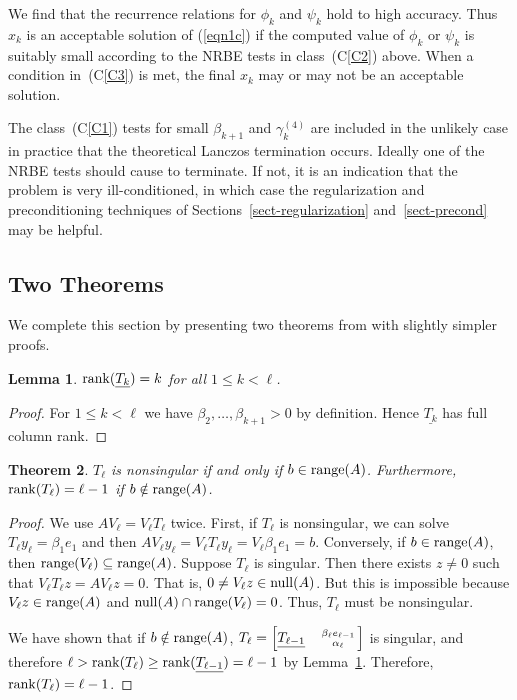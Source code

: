 \documentclass{doc_acmtrans2m}
\newtheorem{theorem}{Theorem}[section]
\newtheorem{lemma}[theorem]{Lemma}
\begin{document}
We find that the recurrence relations for $\phi_k$ and $\psi_k$ hold
to high accuracy. Thus $x_k$ is an acceptable solution of
(\ref{eqn1c}) if the computed value of $\phi_k $ or $\psi_k $ is
suitably small according to the NRBE tests in class~(C\ref{C2})
above. When a condition in~(C\ref{C3}) is met, the final $x_k$ may or
may not be an acceptable solution.

The class~(C\ref{C1}) tests for small $\beta_{k+1}$ and
$\gamma_k^{(4)}$ are included in the unlikely case in practice that
the theoretical Lanczos termination occurs.  Ideally one of the NRBE
tests should cause \MINRESQLP to terminate.  If not, it is an
indication that the problem is very ill-conditioned, in which case the
regularization and preconditioning techniques of
Sections~\ref{sect-regularization} and~\ref{sect-precond} may be
helpful.


\subsection{Two Theorems}

We complete this section by presenting two theorems from \cite{CPS11}
with slightly simpler proofs.

\begin{lemma}\label{lemma-underline-Tk}
$\rank(\underline{T_k}) =  k$ for all $1 \le k < \ell$.
\end{lemma}

\begin{proof}
  For $1 \le k < \ell$ we have $\beta_2,\dots,\beta_{k+1} > 0$ by
  definition.  Hence $\underline{T_k}$ has full column rank.
\end{proof}

\begin{theorem} \label{theorem-Tk}
$T_\ell$ is nonsingular if and only if $b \in \range(A)$.
  Furthermore, $\rank(T_\ell) = \ell-1$ if $b \notin \range(A)$.
\end{theorem}

\begin{proof}
We use $A V_\ell = V_\ell T_\ell$ twice.  First, if $T_\ell$ is
nonsingular, we can solve $T_\ell y_\ell = \beta_1 e_1$ and then $A
V_\ell y_\ell = V_\ell T_\ell y_\ell = V_\ell \beta_1 e_1 = b$.
Conversely, if $b \in \range(A)$, then $\range(V_\ell) \subseteq
\range(A)$.  Suppose $T_\ell$ is singular. Then there exists $z \ne 0$
such that $V_\ell T_\ell z = A V_\ell z=0$. That is, $0 \ne V_\ell z
\in \Null(A)$.  But this is impossible because $V_\ell z \in
\range(A)$ and $\Null(A) \cap \range(V_\ell) = 0$.  Thus, $T_\ell$
must be nonsingular.

We have shown that if $b \notin \range(A)$, $T_\ell =
\bmat{\underline{T_{\ell-1}}&
      \begin{smallmatrix}\beta_\ell e_{\ell-1}
                         \\[1pt] \alpha_\ell
      \end{smallmatrix}}$
is singular, and therefore $\ell > \rank(T_\ell) \ge
\rank(\underline{T_{\ell-1}}) = \ell-1$ by
Lemma~\ref{lemma-underline-Tk}. Therefore, $\rank(T_\ell) = \ell-1$.
\end{proof}
\end{document}
